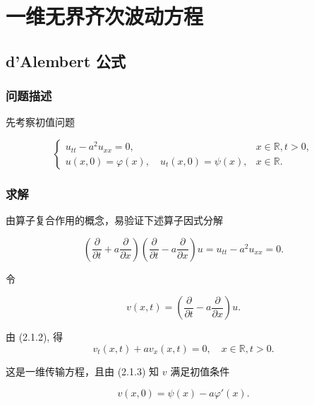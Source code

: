 \documentclass[12pt,a4paper]{article}
\numberwithin{subsection}{section}   %
\numberwithin{subsubsection}{subsection}
\theoremstyle{plain}
\theoremstyle{definition}
\theoremstyle{remark}
\theoremstyle{remark}
\begin{document}
	\newpage
	
	\section{一维无界齐次波动方程}
	
	\subsection{d’Alembert 公式}
	
	\subsubsection{问题描述}
	先考察初值问题
	
	\begin{equation}
		\begin{cases}
			u_{tt} - a^2 u_{xx} = 0, & x \in \mathbb{R}, t > 0, \\
			u(x, 0) = \varphi(x), \quad u_t(x, 0) = \psi(x), & x \in \mathbb{R}.
		\end{cases}
	\end{equation}
	
\subsubsection{求解}
	由算子复合作用的概念，易验证下述算子因式分解
	
	\begin{equation}
		\left( \frac{\partial}{\partial t} + a \frac{\partial}{\partial x} \right) \left( \frac{\partial}{\partial t} - a \frac{\partial}{\partial x} \right) u = u_{tt} - a^2 u_{xx} = 0.
	\end{equation}
	
	令
	
	\begin{equation}
		v(x, t) = \left( \frac{\partial}{\partial t} - a \frac{\partial}{\partial x} \right) u.
	\end{equation}
	
	由 (2.1.2), 得
	\begin{equation}
	v_t(x, t) + a v_x(x, t) = 0, \quad x \in \mathbb{R}, t > 0.
\end{equation}
	
	这是一维传输方程，且由 (2.1.3) 知 \(v\) 满足初值条件
	
	\begin{equation}
	v(x, 0) = \psi(x) - a \varphi'(x).
\end{equation}
	
\end{document}
